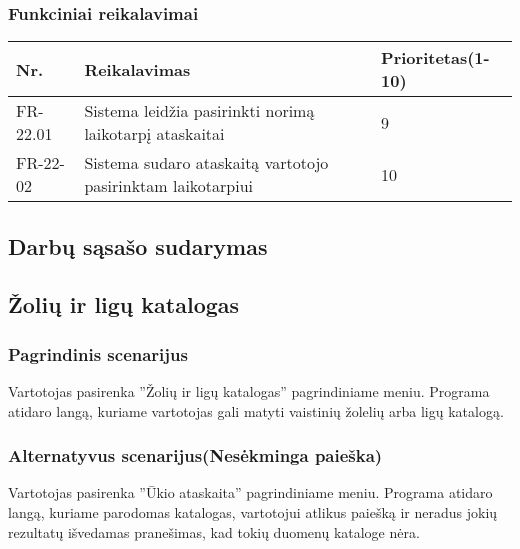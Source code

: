 \documentclass[oneside]{VUMIFPSkursinis}
\begin{document}
	\subsubsection{Funkciniai reikalavimai}
	\begin{table}[htbp]
		\begin{tabularx}{1\textwidth}{ |P{2.5cm}|X|P{3cm }| }  \hline
			Nr. & Reikalavimas & Prioritetas(1-10) \\ \hline
			FR-22.01 & Sistema leidžia pasirinkti norimą laikotarpį ataskaitai & 9 \\ \hline
			FR-22-02 & Sistema sudaro ataskaitą vartotojo pasirinktam laikotarpiui & 10 \\ \hline	
		\end{tabularx}
	\end{table}
\subsection{Darbų sąsašo sudarymas}
\subsection{Žolių ir ligų katalogas}
	\subsubsection{Pagrindinis scenarijus}
	Vartotojas pasirenka ''Žolių ir ligų katalogas'' pagrindiniame meniu. Programa atidaro langą, kuriame vartotojas gali matyti vaistinių žolelių arba ligų katalogą.
	\subsubsection{Alternatyvus scenarijus(Nesėkminga paieška)}
	Vartotojas pasirenka ''Ūkio ataskaita'' pagrindiniame meniu. Programa atidaro langą, kuriame parodomas katalogas, vartotojui atlikus paiešką ir neradus jokių rezultatų išvedamas pranešimas, kad tokių duomenų kataloge nėra.
\end{document}
